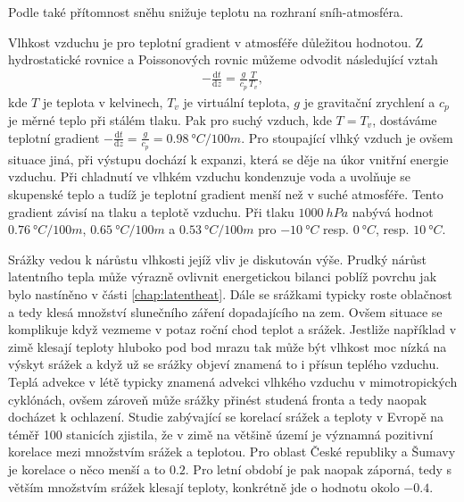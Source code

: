 Podle \cite{zhangwei2021} také přítomnost sněhu snižuje teplotu na rozhraní sníh-atmosféra.

Vlhkost vzduchu je pro teplotní gradient v atmosféře důležitou hodnotou. Z hydrostatické rovnice a Poissonových rovnic můžeme odvodit následující vztah\cite{jakvznikapocasi}
\begin{gather*}
-\frac{\text{d}t}{\text{d}z} = \frac{g}{c_p}\frac{T}{T_v},
\end{gather*}
kde $T$ je teplota v kelvinech, $T_v$ je virtuální teplota, $g$ je gravitační zrychlení a $c_p$ je měrné teplo při stálém tlaku. Pak pro suchý vzduch, kde $T=T_v$, dostáváme teplotní gradient $-\frac{\text{d}t}{\text{d}z} = \frac{g}{c_p} = \SI{0.98}{\degree C/100 m}$. Pro stoupající vlhký vzduch je ovšem situace jiná, při výstupu dochází k expanzi, která se děje na úkor vnitřní energie vzduchu. Při chladnutí ve vlhkém vzduchu kondenzuje voda a uvolňuje se skupenské teplo a tudíž je teplotní gradient menší než v suché atmosféře. Tento gradient závisí na tlaku a teplotě vzduchu. Při tlaku $\SI{1000}{hPa}$ nabývá hodnot $\SI{0.76}{\degree C/100 m}$, $\SI{0.65}{\degree C/100 m}$ a $\SI{0.53}{\degree C/100 m}$ pro $\SI{-10}{\degree C}$ resp. $\SI{0}{\degree C}$, resp. $\SI{10}{\degree C}$\cite{jakvznikapocasi}.

Srážky vedou k nárůstu vlhkosti jejíž vliv je diskutován výše. Prudký nárůst latentního tepla může výrazně ovlivnit energetickou bilanci poblíž povrchu jak bylo nastíněno v části \ref{chap:latentheat}. Dále se srážkami typicky roste oblačnost a tedy klesá množství slunečního záření dopadajícího na zem. Ovšem situace se komplikuje když vezmeme v potaz roční chod teplot a srážek. Jestliže například v zimě klesají teploty hluboko pod bod mrazu tak může být vlhkost moc nízká na výskyt srážek a když už se srážky objeví znamená to i přísun teplého vzduchu. Teplá advekce v létě typicky znamená advekci vlhkého vzduchu v mimotropických cyklónách, ovšem zároveň může srážky přinést studená fronta a tedy naopak docházet k ochlazení. Studie zabývající se korelací srážek a teploty v Evropě na téměř 100 stanicích zjistila, že v zimě na většině území je významná pozitivní korelace mezi množstvím srážek a teplotou. Pro oblast České republiky a Šumavy je korelace o něco menší a to $0.2$. Pro letní období je pak naopak záporná, tedy s větším množstvím srážek klesají teploty, konkrétně jde o hodnotu okolo $-0.4$\cite{maddenroland1978}.

